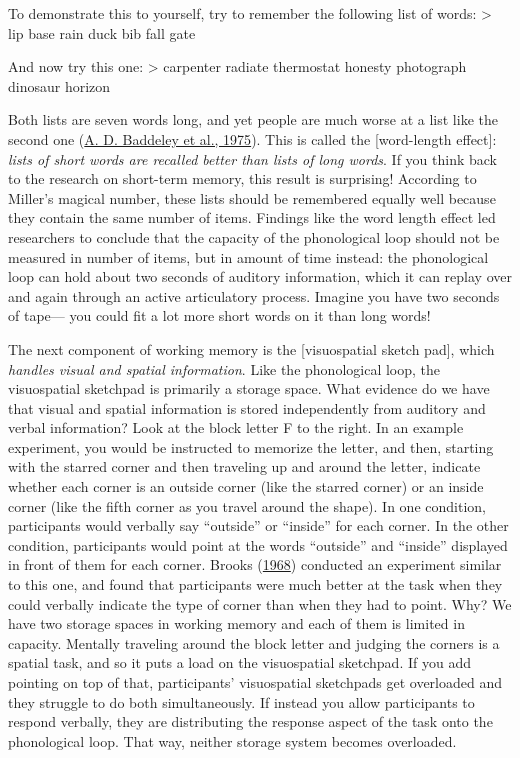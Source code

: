 \documentclass[
]{krantz}
\begin{document}
To demonstrate this to yourself, try to remember the following list of words:
\textgreater{} lip base rain duck bib fall gate

And now try this one:
\textgreater{} carpenter radiate thermostat honesty photograph dinosaur horizon

Both lists are seven words long, and yet people are much worse at a list like the second one (\protect\hyperlink{ref-baddeley1975word}{A. D. Baddeley et al., 1975}). This is called the {[}word-length effect{]}: \emph{lists of short words are recalled better than lists of long words}. If you think back to the research on short-term memory, this result is surprising! According to Miller's magical number, these lists should be remembered equally well because they contain the same number of items. Findings like the word length effect led researchers to conclude that the capacity of the phonological loop should not be measured in number of items, but in amount of time instead: the phonological loop can hold about two seconds of auditory information, which it can replay over and again through an active articulatory process. Imagine you have two seconds of tape--- you could fit a lot more short words on it than long words!

The next component of working memory is the {[}visuospatial sketch pad{]}, which \emph{handles visual and spatial information}. Like the phonological loop, the visuospatial sketchpad is primarily a storage space. What evidence do we have that visual and spatial information is stored independently from auditory and verbal information? Look at the block letter F to the right. In an example experiment, you would be instructed to memorize the letter, and then, starting with the starred corner and then traveling up and around the letter, indicate whether each corner is an outside corner (like the starred corner) or an inside corner (like the fifth corner as you travel around the shape). In one condition, participants would verbally say ``outside'' or ``inside'' for each corner. In the other condition, participants would point at the words ``outside'' and ``inside'' displayed in front of them for each corner. Brooks (\protect\hyperlink{ref-Brooks1968}{1968}) conducted an experiment similar to this one, and found that participants were much better at the task when they could verbally indicate the type of corner than when they had to point. Why? We have two storage spaces in working memory and each of them is limited in capacity. Mentally traveling around the block letter and judging the corners is a spatial task, and so it puts a load on the visuospatial sketchpad. If you add pointing on top of that, participants' visuospatial sketchpads get overloaded and they struggle to do both simultaneously. If instead you allow participants to respond verbally, they are distributing the response aspect of the task onto the phonological loop. That way, neither storage system becomes overloaded.
\end{document}
